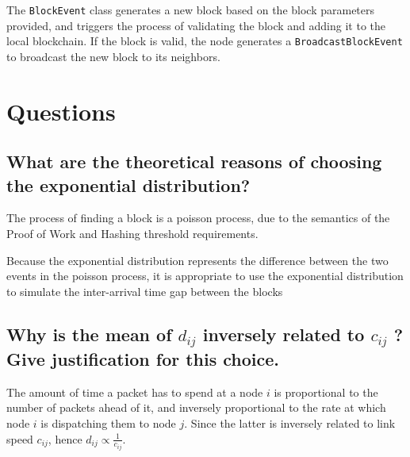 \documentclass[a4paper,14pt]{article}
\begin{document}
The \verb|BlockEvent| class generates a new block based on the block parameters provided, and triggers the process of validating the block and adding it to the local blockchain. If the block is valid, the node generates a \verb|BroadcastBlockEvent| to broadcast the new block to its neighbors.


\section{Questions}

\subsection{ What are the theoretical reasons of choosing the exponential distribution?}

The process of finding a block is a poisson process, due to the semantics of the Proof of Work and Hashing threshold requirements.

Because the exponential distribution represents the difference between the two events in the poisson process, it is appropriate to use the exponential distribution to simulate the inter-arrival time gap between the blocks

\subsection{ Why is the mean of $d_{ij}$ inversely related to $c_{ij}$ ? Give justification for this choice.}

The amount of time a packet has to spend at a node $i$ is proportional to the number of packets ahead of it, and inversely proportional to the rate at which node $i$ is dispatching them to node $j$.
Since the latter is inversely related to link speed $c_{ij}$, hence $d_{ij} \propto \frac{1}{c_{ij}}$.
\end{document}
